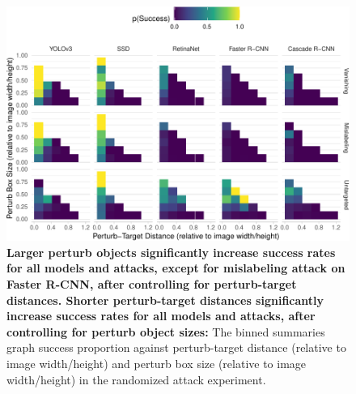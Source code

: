 \begin{figure}[tb]

{\centering \includegraphics{imgs/perturb_bbox_and_object_dist_graph-1} 

}

\caption{\textbf{Larger perturb objects significantly increase success rates for all models and attacks, except for mislabeling attack on Faster R-CNN, after controlling for perturb-target distances. Shorter perturb-target distances significantly increase success rates for all models and attacks, after controlling for perturb object sizes:}  The binned summaries graph success proportion against perturb-target distance (relative to image width/height) and perturb box size (relative to image width/height) in the randomized attack experiment.}\label{fig:perturb_bbox_and_object_dist_graph}
\end{figure}

\begingroup\fontsize{9}{11}\selectfont

